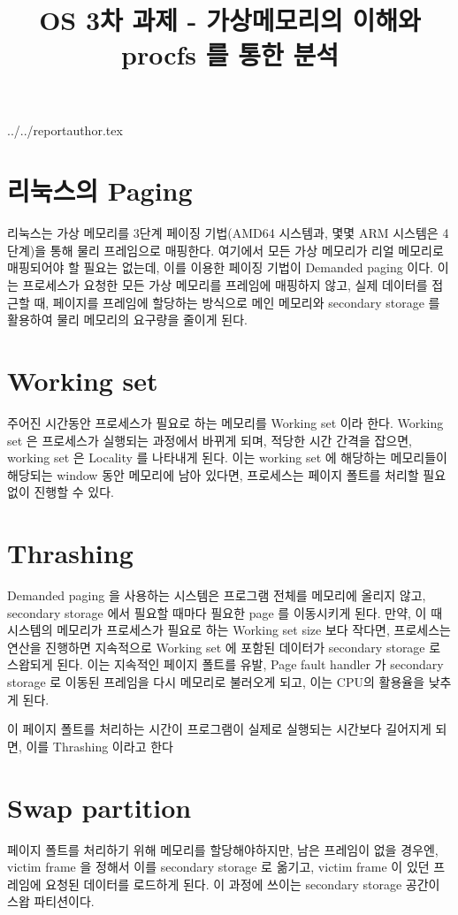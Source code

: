 \documentclass {article}
\begin{document}
\title {OS 3차 과제 - 가상메모리의 이해와 procfs 를 통한 분석}
 {../../reportauthor.tex}
\maketitle


\section {리눅스의 Paging}
리눅스는 가상 메모리를 3단계 페이징 기법(AMD64 시스템과, 몇몇 ARM 시스템은 4단계)을 통해 물리 프레임으로 매핑한다. 여기에서 모든 가상 메모리가 리얼 메모리로 매핑되어야 할 필요는 없는데, 이를 이용한 페이징 기법이 Demanded paging 이다. 이는 프로세스가 요청한 모든 가상 메모리를 프레임에 매핑하지 않고, 실제 데이터를 접근할 때, 페이지를 프레임에 할당하는 방식으로 메인 메모리와 secondary storage 를 활용하여 물리 메모리의 요구량을 줄이게 된다.
\section {Working set}
주어진 시간동안 프로세스가 필요로 하는 메모리를 Working set 이라 한다. Working set 은 프로세스가 실행되는 과정에서 바뀌게 되며, 적당한 시간 간격을 잡으면, working set 은 Locality 를 나타내게 된다. 이는 working set 에 해당하는 메모리들이 해당되는 window 동안 메모리에 남아 있다면, 프로세스는 페이지 폴트를 처리할 필요 없이 진행할 수 있다.
\section {Thrashing}
Demanded paging 을 사용하는 시스템은 프로그램 전체를 메모리에 올리지 않고, secondary storage 에서 필요할 때마다 필요한 page 를 이동시키게 된다. 만약, 이 때 시스템의 메모리가 프로세스가 필요로 하는 Working set size 보다 작다면, 프로세스는 연산을 진행하면 지속적으로 Working set 에 포함된 데이터가 secondary storage 로 스왑되게 된다. 이는 지속적인 페이지 폴트를 유발, Page fault handler 가 secondary storage 로 이동된 프레임을 다시 메모리로 불러오게 되고, 이는 CPU의 활용율을 낮추게 된다.

이 페이지 폴트를 처리하는 시간이 프로그램이 실제로 실행되는 시간보다 길어지게 되면, 이를 Thrashing 이라고 한다 
\section {Swap partition}
페이지 폴트를 처리하기 위해 메모리를 할당해야하지만, 남은 프레임이 없을 경우엔, victim frame 을 정해서 이를 secondary storage 로 옮기고, victim frame 이 있던 프레임에 요청된 데이터를 로드하게 된다. 이 과정에 쓰이는 secondary storage 공간이 스왑 파티션이다.
\end{document}
